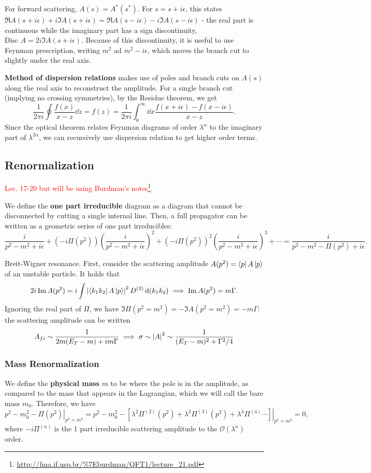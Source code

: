 \documentclass{article}
\begin{document}
\example For forward scattering, $A(s)=A^*(s^*)$. For $s=s+i\epsilon$, this states $\Re A(s+i\epsilon)+i\Im A(s+i\epsilon)=\Re A(s-i\epsilon)-i\Im A(s-i\epsilon)$ - the real part is continuous while the imaginary part has a sign discontinuity, $\text{Disc }A=2i\Im A(s+i\epsilon)$. Because of this discontinuity, it is useful to use Feynman prescription, writing $m^2$ ad $m^2-i\epsilon$, which moves the branch cut to slightly under the real axis. 

\textbf{Method of dispersion relations} makes use of poles and branch cuts on $A(s)$ along the real axis to reconstruct the amplitude. For a single branch cut (implying no crossing symmetries), by the Residue theorem, we get 
$$\frac 1{2\pi i}\oint\frac{f(x)}{x-z}\dd z=f(z)=\frac 1{2\pi i}\int^\infty_0\dd x\frac{f(x+i\epsilon)-f(x-i\epsilon)}{x-z}.$$
Since the optical theorem relates Feynman diagrams of order $\lambda^\alpha$ to the imaginary part of $\lambda^{2\alpha}$, we can recursively use dispersion relation to get higher order terms.



\subsection{Renormalization}
\textcolor{red}{Lec. 17-20 but will be using Burdman's notes\footnote{\url{http://fma.if.usp.br/\%7Eburdman/QFT1/lecture_21.pdf}}.}



We define the \textbf{one part irreducible} diagram as a diagram that cannot be disconnected by cutting a single internal line. Then, a full propagator can be written as a geometric series of one part irreducibles:
$$\frac i{p^2-m^2+i\epsilon}+(-i\Pi(p^2))\left(\frac i{p^2-m^2+i\epsilon}\right)^2+(-i\Pi(p^2))^2\left(\frac i{p^2-m^2+i\epsilon}\right)^3+\cdots=\frac i{p^2-m^2-\Pi(p^2)+i\epsilon}.$$

\example Breit-Wigner resonance. First, consider the scattering amplitude $A(p^2)=\bra pA\ket p$ of an unstable particle. It holds that 
$$2i\Im A(p^2)=i\int\left\lvert\bra{k_1k_2}A\ket p\right\rvert^2 D^{(2)}\dd(k_1k_2)\implies \Im A(p^2)=m\Gamma.$$ 
Ignoring the real part of $\Pi$, we have $\Im\Pi(p^2=m^2)=-\Im A(p^2=m^2)=-m\Gamma$: the scattering amplitude can be written 
$$A_{fi}\sim \frac 1{2m(E_T-m)+im\Gamma}\implies\sigma\sim\left\lvert A\right\rvert^2\sim\frac 1{(E_T-m)^2+\Gamma^2/4}$$

\subsubsection{Mass Renormalization}
We define the \textbf{physical mass} $m$ to be where the pole is in the amplitude, as compared to the mass that appears in the Lagrangian, which we will call the bare mass $m_0$. Therefore, we have 
$$p^2-m_0^2-\left.\Pi(p^2)\right|_{p^2=m^2}=p^2-m_0^2-\left.\left[\lambda^2\Pi^{(2)}(p^2)+\lambda^3\Pi^{(3)}(p^2)+\lambda^4\Pi^{(4)}\cdots\right]\right|_{p^2=m^2}=0,$$
where $-i\Pi^{(n)}$ is the 1 part irreducible scattering amplitude to the $\mathcal O(\lambda^n)$ order.
\end{document}
